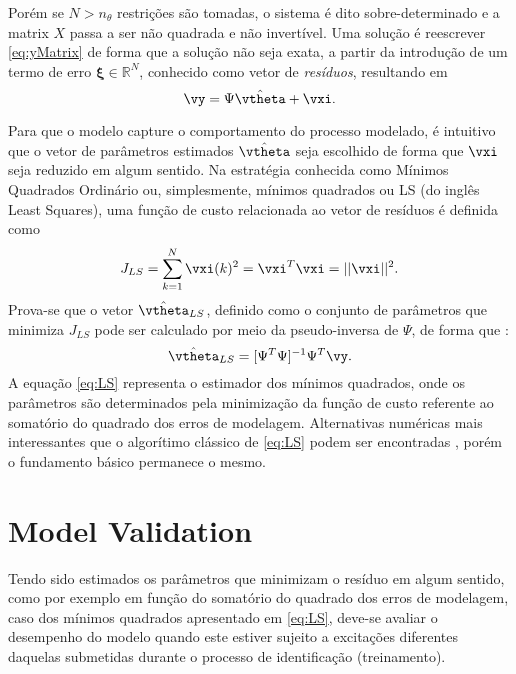 Porém se $N > n_\theta$ restrições são tomadas, o sistema é dito sobre-determinado e a matrix $X$ passa a ser não quadrada e não invertível. Uma solução é reescrever \eqref{eq:yMatrix} de forma que a solução não seja exata, a partir da introdução de um termo de erro $\bm{\xi} \in \mathbb{R}^N$, conhecido como vetor de \emph{resíduos}, resultando em
\begin{equation} 
\label{eq:ysobredet}
   \vy =  \Psi\hat{\vtheta} + \vxi.
\end{equation}

Para que o modelo capture o comportamento do processo modelado, é intuitivo que o vetor de parâmetros estimados $\hat{\vtheta}$ seja escolhido de forma que $\vxi$ seja reduzido em algum sentido. Na estratégia conhecida como Mínimos Quadrados Ordinário ou, simplesmente, mínimos quadrados ou LS (do inglês Least Squares), uma função de custo relacionada ao vetor de resíduos é definida como
\begin{equation}
\label{eq:JLS}
   J_{LS} = \sum_{k=1}^{N} \vxi(k)^2 = \vxi^T\vxi = ||\vxi||^2.
\end{equation}
Prova-se que o vetor $\hat{\vtheta}_{LS}$, definido como o conjunto de parâmetros que minimiza $J_{LS}$ pode ser calculado por meio da pseudo-inversa de $\Psi$, de forma que \citep{aguirre2015}:
\begin{equation}
   \hat{\vtheta}_{LS} = [\Psi^T \Psi]^{-1}\Psi^T \vy.
   \label{eq:LS}
\end{equation}
A equação \eqref{eq:LS} representa o estimador dos mínimos quadrados, onde os parâmetros são determinados pela minimização da função de custo referente ao somatório do quadrado dos erros de modelagem.
Alternativas numéricas mais interessantes que o algorítimo clássico de \eqref{eq:LS} podem ser encontradas \citep{aguirre2015,ljung1999}, porém o fundamento básico permanece o mesmo.


\section{Model Validation}\label{sec:model_validation}

Tendo sido estimados os parâmetros que minimizam o resíduo em algum sentido, como por exemplo em função do somatório do quadrado dos erros de modelagem, caso dos mínimos quadrados apresentado em \eqref{eq:LS}, deve-se avaliar o desempenho do modelo quando este estiver sujeito a excitações diferentes daquelas submetidas durante o processo de identificação (treinamento). 

